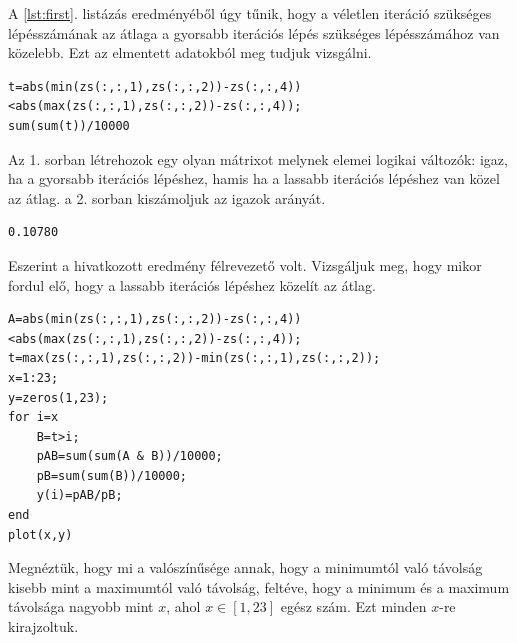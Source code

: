 \documentclass[a4paper,12pt]{report}
\begin{document}
				A \ref{lst:first}. listázás eredményéből úgy tűnik, hogy a véletlen iteráció szükséges lépésszámának az átlaga a gyorsabb iterációs lépés szükséges lépésszámához van közelebb. Ezt az elmentett adatokból meg tudjuk vizsgálni.
				\begin{singlespace}
                \begin{lstlisting}[caption=Bemenet]
t=abs(min(zs(:,:,1),zs(:,:,2))-zs(:,:,4))<abs(max(zs(:,:,1),zs(:,:,2))-zs(:,:,4));
sum(sum(t))/10000
				\end{lstlisting}
                \end{singlespace}
				Az 1. sorban létrehozok egy olyan mátrixot melynek elemei logikai változók: igaz, ha a gyorsabb iterációs lépéshez, hamis ha a lassabb iterációs lépéshez van közel az átlag. a 2. sorban kiszámoljuk az igazok arányát.
				\begin{singlespace}
                \begin{lstlisting}[caption=Eredm\'eny]
0.10780
				\end{lstlisting}
                \end{singlespace}
				Eszerint a hivatkozott eredmény félrevezető volt. Vizsgáljuk meg, hogy mikor fordul elő, hogy a lassabb iterációs lépéshez közelít az átlag.
		        \begin{singlespace}
                \begin{lstlisting}[caption=Bemenet,label=lst:feltP]		
A=abs(min(zs(:,:,1),zs(:,:,2))-zs(:,:,4))<abs(max(zs(:,:,1),zs(:,:,2))-zs(:,:,4));
t=max(zs(:,:,1),zs(:,:,2))-min(zs(:,:,1),zs(:,:,2));
x=1:23;
y=zeros(1,23);
for i=x
    B=t>i;
    pAB=sum(sum(A & B))/10000;
    pB=sum(sum(B))/10000;
    y(i)=pAB/pB;
end
plot(x,y)
                \end{lstlisting}
                \end{singlespace}
                Megnéztük, hogy mi a valószínűsége annak, hogy a minimumtól való távolság kisebb mint a maximumtól való távolság, feltéve, hogy a minimum és a maximum távolsága nagyobb mint $x$, ahol $x\in [1,23]$ egész szám. Ezt minden $x$-re kirajzoltuk.
                
\end{document}
